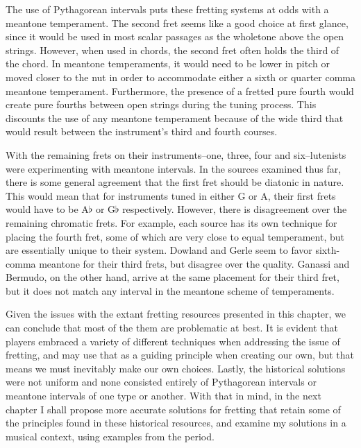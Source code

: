 The use of Pythagorean intervals puts these fretting systems at odds with a meantone temperament.
The second fret seems like a good choice at first glance, since it would be used in most scalar
passages as the wholetone above the open strings.  However, when used in chords, the second fret
often holds the third of the chord. In meantone temperaments, it would need to be lower in pitch or
moved closer to the nut in order to accommodate either a sixth or quarter comma meantone
temperament. Furthermore, the presence of a fretted pure fourth would create pure fourths between
open strings during the tuning process.  This discounts the use of any meantone temperament because
of the wide third that would result between the instrument's third and fourth courses.

With the remaining frets on their instruments--one, three, four and six--lutenists were
experimenting with meantone intervals. In the sources examined thus far, there is some general
agreement that the first fret should be diatonic in nature.  This would mean that for instruments
tuned in either G or A, their first frets would have to be A$\flat$ or G$\flat$ respectively.
However, there is disagreement over the remaining chromatic frets. For example, each source has its
own technique for placing the fourth fret, some of which are very close to equal temperament, but
are essentially unique to their system.  Dowland and Gerle seem to favor sixth-comma meantone for
their third frets, but disagree over the quality. Ganassi and Bermudo, on the other hand, arrive at
the same placement for their third fret, but it does not match any interval in the meantone scheme
of temperaments.

Given the issues with the extant fretting resources presented in this chapter, we can conclude that
most of the them are problematic at best.  It is evident that players embraced a variety of
different techniques when addressing the issue of fretting, and may use that as a guiding principle
when creating our own, but that means we must inevitably make our own choices.  Lastly, the
historical solutions were not uniform and none consisted entirely of Pythagorean intervals or
meantone intervals of one type or another. With that in mind, in the next chapter I shall propose
more accurate solutions for fretting that retain some of the principles found in these historical
resources, and examine my solutions in a musical context, using examples from the period.
